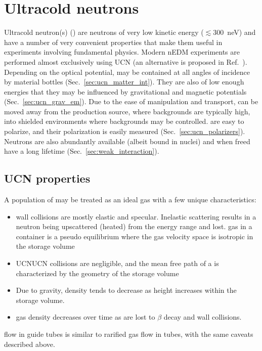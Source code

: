 
\chapter{Ultracold neutrons}\label{chap:UCN}


Ultracold neutron(s) (\ucn) are neutrons of very low kinetic energy ($\lesssim$\qty{300}{\nano\eV}) and have a number of very convenient properties that make them useful in experiments involving fundamental physics. Modern nEDM experiments are performed almost exclusively using UCN \cite{BAK06, SER15, ABE20} (an alternative is proposed in Ref.~\cite{PIE13}). Depending on the optical potential, \ucn may be contained at all angles of incidence by material bottles (Sec.~\ref{sec:ucn_matter_int}). They are also of low enough energies that they may be influenced by gravitational and magnetic potentials (Sec.~\ref{sec:ucn_grav_em}). Due to the ease of manipulation and transport, \ucn can be moved away from the production source, where backgrounds are typically high, into shielded environments where backgrounds may be controlled. \ucn are easy to polarize, and their polarization is easily measured (Sec.~\ref{sec:ucn_polarizers}). Neutrons are also abundantly available (albeit bound in nuclei) and when freed have a long lifetime (Sec.~\ref{sec:weak_interaction}).


\section{UCN properties}


A population of \ucn may be treated as an ideal gas with a few unique characteristics: \cite{golubUCN}
%
\begin{itemize}
    \item \ucn wall collisions are mostly elastic and specular. Inelastic scattering results in a neutron being upscattered (heated) from the \ucn energy range and lost. \ucn gas in a container is a pseudo equilibrium where the gas velocity space is isotropic in the storage volume
    \item UCN\textendash UCN collisions are negligible, and the mean free path of a \ucn is characterized by the geometry of the storage volume
    \item Due to gravity, \ucn density tends to decrease as height increases within the storage volume.
    \item \ucn gas density decreases over time as \ucn are lost to $\beta$ decay and wall collisions.
\end{itemize}
%
\ucn flow in guide tubes is similar to rarified gas flow in tubes, with the same caveats described above.

